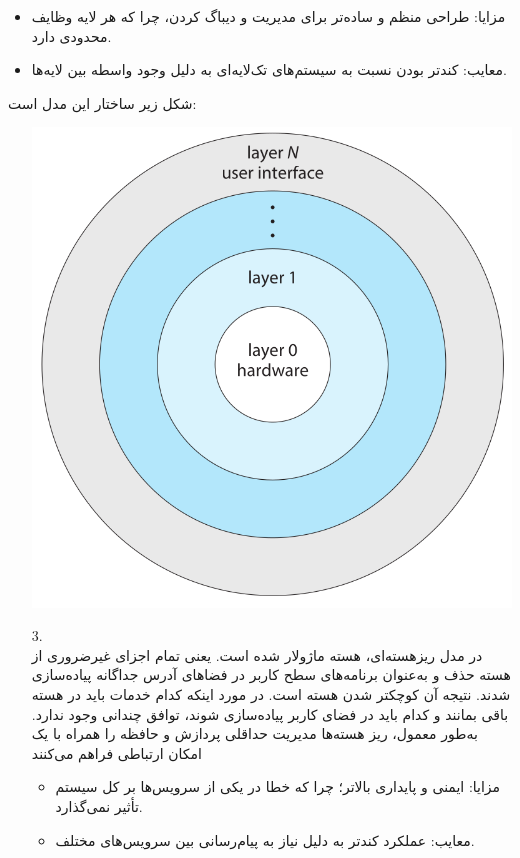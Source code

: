 \begin{qsolve}
\begin{enumerate}
		
		\begin{itemize}
			\item
			مزایا: طراحی منظم و ساده‌تر برای مدیریت و دیباگ کردن، چرا که هر لایه وظایف محدودی دارد.
			
			\item 
			معایب: کندتر بودن نسبت به سیستم‌های تک‌لایه‌ای به دلیل وجود واسطه بین لایه‌ها.
		\end{itemize}
		
		شکل زیر ساختار این مدل است:
		
		
	\end{enumerate}
\end{qsolve}




\begin{qsolve}
	\begin{enumerate}
		\item [ ]
		\begin{center}
			\includegraphics*[width=0.4\linewidth]{pics/img5.png}
		\end{center}
		
		
		
		
		\item [3.]
		\\
		در مدل ریزهسته‌ای، هسته ماژولار شده است. یعنی تمام اجزای غیرضروری از هسته حذف و به‌عنوان برنامه‌های سطح کاربر در فضاهای آدرس جداگانه پیاده‌سازی شدند. نتیجه آن کوچکتر شدن هسته است. در مورد اینکه کدام خدمات باید در هسته باقی بمانند و کدام باید در فضای کاربر پیاده‌سازی شوند، توافق چندانی وجود ندارد. به‌طور معمول، ریز هسته‌ها مدیریت حداقلی پردازش و حافظه را همراه با یک امکان ارتباطی فراهم می‌کنند
				
		\begin{itemize}
			\item
			مزایا: ایمنی و پایداری بالاتر؛ چرا که خطا در یکی از سرویس‌ها بر کل سیستم تأثیر نمی‌گذارد.
			
			\item 
			معایب: عملکرد کندتر به دلیل نیاز به پیام‌رسانی بین سرویس‌های مختلف.
		\end{itemize}
		

\end{enumerate}
\end{qsolve}
